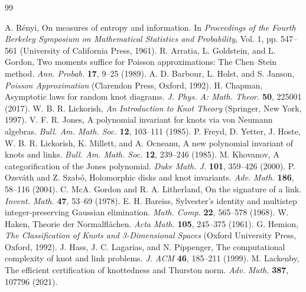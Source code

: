 \documentclass[9pt,twoside]{pnas-new}
\theoremstyle{definition}
\theoremstyle{remark}
\begin{document}
\begin{thebibliography}{99}

A. R\'enyi, On measures of entropy and information. In \emph{Proceedings of the Fourth Berkeley Symposium on Mathematical Statistics and Probability}, Vol. 1, pp. 547--561 (University of California Press, 1961).
R. Arratia, L. Goldstein, and L. Gordon, Two moments suffice for Poisson approximations: The Chen--Stein method. \emph{Ann. Probab.} \textbf{17}, 9--25 (1989).
A. D. Barbour, L. Holst, and S. Janson, \emph{Poisson Approximation} (Clarendon Press, Oxford, 1992).
H. Chapman, Asymptotic laws for random knot diagrams. \emph{J. Phys. A: Math. Theor.} \textbf{50}, 225001 (2017).
W. B. R. Lickorish, \emph{An Introduction to Knot Theory} (Springer, New York, 1997).
V. F. R. Jones, A polynomial invariant for knots via von Neumann algebras. \emph{Bull. Am. Math. Soc.} \textbf{12}, 103--111 (1985).
P. Freyd, D. Yetter, J. Hoste, W. B. R. Lickorish, K. Millett, and A. Ocneanu, A new polynomial invariant of knots and links. \emph{Bull. Am. Math. Soc.} \textbf{12}, 239--246 (1985).
M. Khovanov, A categorification of the Jones polynomial. \emph{Duke Math. J.} \textbf{101}, 359--426 (2000).
P. Ozsv\'ath and Z. Szab\'o, Holomorphic disks and knot invariants. \emph{Adv. Math.} \textbf{186}, 58--116 (2004).
C. McA. Gordon and R. A. Litherland, On the signature of a link. \emph{Invent. Math.} \textbf{47}, 53--69 (1978).
E. H. Bareiss, Sylvester's identity and multistep integer-preserving Gaussian elimination. \emph{Math. Comp.} \textbf{22}, 565--578 (1968).
W. Haken, Theorie der Normalfl\"achen. \emph{Acta Math.} \textbf{105}, 245--375 (1961).
G. Hemion, \emph{The Classification of Knots and 3-Dimensional Spaces} (Oxford University Press, Oxford, 1992).
J. Hass, J. C. Lagarias, and N. Pippenger, The computational complexity of knot and link problems. \emph{J. ACM} \textbf{46}, 185--211 (1999).
M. Lackenby, The efficient certification of knottedness and Thurston norm. \emph{Adv. Math.} \textbf{387}, 107796 (2021).
\end{thebibliography}
\end{document}
